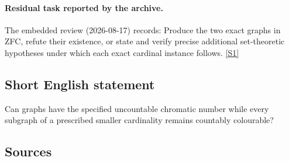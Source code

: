 \documentclass[11pt,a4paper]{article}
\newcommand{\sref}[2]{\hyperlink{source:#1:#2}{[S#2]}}
\begin{document}
\paragraph{Residual task reported by the archive.}

The embedded review (2026-08-17) records: Produce the two exact graphs in ZFC, refute their existence, or state and verify precise additional set-theoretic hypotheses under which each exact cardinal instance follows. \sref{2381}{1}

\subsection{Short English statement}

Can graphs have the specified uncountable chromatic number while every subgraph of a prescribed smaller cardinality remains countably colourable?

\subsection{Sources}
\end{document}
